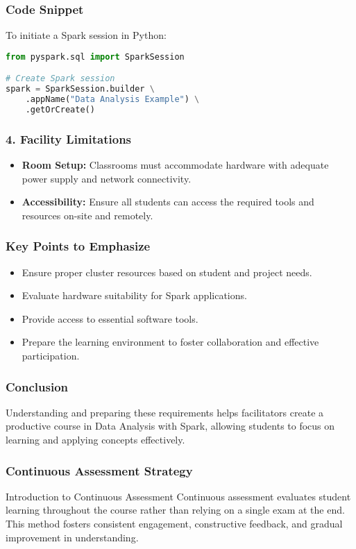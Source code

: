 \documentclass[aspectratio=169]{beamer}
\begin{document}
\begin{frame}[fragile]
  \frametitle{Code Snippet}
  To initiate a Spark session in Python:
  \begin{lstlisting}[language=Python]
from pyspark.sql import SparkSession

# Create Spark session
spark = SparkSession.builder \
    .appName("Data Analysis Example") \
    .getOrCreate()
  \end{lstlisting}
\end{frame}

\begin{frame}
  \frametitle{4. Facility Limitations}
  \begin{itemize}
    \item \textbf{Room Setup:} Classrooms must accommodate hardware with adequate power supply and network connectivity.
    \item \textbf{Accessibility:} Ensure all students can access the required tools and resources on-site and remotely.
  \end{itemize}
\end{frame}

\begin{frame}
  \frametitle{Key Points to Emphasize}
  \begin{itemize}
    \item Ensure proper cluster resources based on student and project needs.
    \item Evaluate hardware suitability for Spark applications.
    \item Provide access to essential software tools.
    \item Prepare the learning environment to foster collaboration and effective participation.
  \end{itemize}
\end{frame}

\begin{frame}
  \frametitle{Conclusion}
  Understanding and preparing these requirements helps facilitators create a productive course in Data Analysis with Spark, allowing students to focus on learning and applying concepts effectively.
\end{frame}

\begin{frame}
    \frametitle{Continuous Assessment Strategy}
    \begin{block}{Introduction to Continuous Assessment}
        Continuous assessment evaluates student learning throughout the course rather than relying on a single exam at the end. 
        This method fosters consistent engagement, constructive feedback, and gradual improvement in understanding.
    \end{block}
\end{frame}
\end{document}
